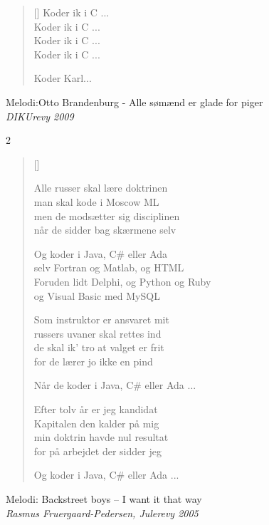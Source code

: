 \begin{multicols}{2}
\begin{verse}[\versewidth]
Koder ik i C ...\\
Koder ik i C ...\\
Koder ik i C ...\\
Koder ik i C ...

Koder Karl...

\end{verse}
\end{multicols}

{Melodi:Otto Brandenburg - Alle sømænd er glade for piger}\\[.2em]
{\small\itshape DIKUrevy 2009}
\begin{multicols}2
\settowidth{\versewidth}{Foruden lidt Delphi, og Python og Ruby}
\begin{verse}[\versewidth]

Alle russer skal lære doktrinen\\
man skal kode i Moscow ML\\
men de modsætter sig disciplinen\\
når de sidder bag skærmene selv

Og koder i Java, C\# eller Ada\\
selv Fortran og Matlab, og HTML\\
Foruden lidt Delphi, og Python og Ruby\\
og Visual Basic med MySQL

Som instruktor er ansvaret mit\\
russers uvaner skal rettes ind\\
de skal ik' tro at valget er frit\\
for de lærer jo ikke en pind

Når de koder i Java, C\# eller Ada ...

Efter tolv år er jeg kandidat\\
Kapitalen den kalder på mig\\
min doktrin havde nul resultat\\
for på arbejdet der sidder jeg

Og koder i Java, C\# eller Ada ...
\end{verse}
\end{multicols}
\newpage

{Melodi: Backstreet boys -- I want it that way}\\[.2em]
{\small\itshape Rasmus Fruergaard-Pedersen, Julerevy 2005}

